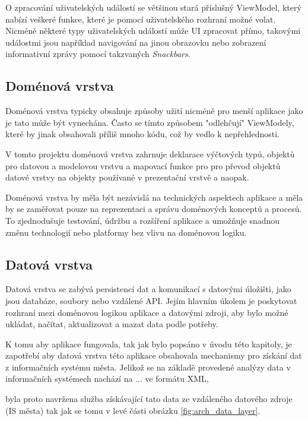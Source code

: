 O zpracování uživatelských událostí se většinou stará příslušný ViewModel, který nabízí veškeré funkce, které je pomocí uživatelského rozhraní možné volat.
Nicméně některé typy uživatelských událostí může UI zpracovat přímo, takovými událostmi jsou například navigování na jinou obrazovku nebo zobrazení 
informativní zprávy pomocí takzvaných \textit{Snackbars}.

\subsection*{Doménová vrstva}
Doménová vrstva typicky obsahuje způsoby užití nicméně pro menší aplikace jako je tato může být vynechána. Často se tímto způsobem "odlehčují" ViewModely,
které by jinak obsahovali příliš mnoho kódu, což by vedlo k nepřehlednosti.

V tomto projektu doménová vrstva zahrnuje deklarace výčtových typů, objektů pro datovou a modelovou vrstvu a mapovací funkce pro pro převod
objektů datové vrstvy na objekty používané v prezentační vrstvě a naopak.

Doménová vrstva by měla být nezávislá na technických aspektech aplikace a měla by se zaměřovat pouze na reprezentaci a správu doménových
 konceptů a procesů. To zjednodušuje testování, údržbu a rozšíření aplikace a umožňuje snadnou změnu technologií nebo platformy bez 
 vlivu na doménovou logiku.

\subsection*{Datová vrstva}


Datová vrstva se zabývá persistencí dat a komunikací s datovými úložišti, jako jsou
databáze, soubory nebo vzdálené API. Jejím hlavním úkolem je poskytovat rozhraní mezi doménovou logikou aplikace a datovými zdroji, 
aby bylo možné ukládat, načítat, aktualizovat a mazat data podle potřeby.

K tomu aby aplikace fungovala, tak jak bylo popsáno v úvodu této kapitoly, je zapotřebí aby datová vrstva této aplikace obsahovala mechanismy pro
 získání dat z informačních systému města. Jelikož se na základě provedené analýzy data v informačních systémech nachází na ... ve formátu XML, 


 byla proto navržena služba získávající tato data ze vzdáleného datového zdroje (IS města) tak jak se tomu v levé části obrázku \ref{fig:arch_data_layer}. 


